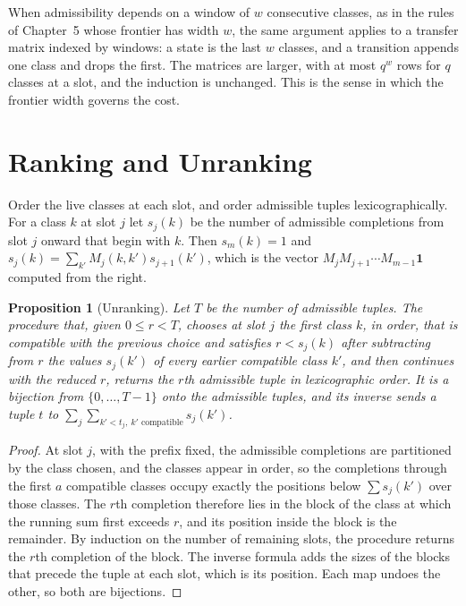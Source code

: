 \documentclass[11pt,twoside,openright]{book}
\theoremstyle{plain}
\newtheorem{proposition}[theorem]{Proposition}
\theoremstyle{definition}
\theoremstyle{remark}
\begin{document}
When admissibility depends on a window of $w$ consecutive classes, as in the rules of Chapter~5 whose frontier has width $w$, the same argument applies to a transfer matrix indexed by windows: a state is the last $w$ classes, and a transition appends one class and drops the first. The matrices are larger, with at most $q^w$ rows for $q$ classes at a slot, and the induction is unchanged. This is the sense in which the frontier width governs the cost.

\section{Ranking and Unranking}\label{sec:rank}

Order the live classes at each slot, and order admissible tuples lexicographically. For a class $k$ at slot $j$ let $s_j(k)$ be the number of admissible completions from slot $j$ onward that begin with $k$. Then $s_m(k)=1$ and $s_j(k)=\sum_{k'}M_j(k,k')s_{j+1}(k')$, which is the vector $M_jM_{j+1}\cdots M_{m-1}\mathbf 1$ computed from the right.

\begin{proposition}[Unranking]\label{prop:unrankapp}
Let $T$ be the number of admissible tuples. The procedure that, given $0\le r<T$, chooses at slot $j$ the first class $k$, in order, that is compatible with the previous choice and satisfies $r<s_j(k)$ after subtracting from $r$ the values $s_j(k')$ of every earlier compatible class $k'$, and then continues with the reduced $r$, returns the $r$th admissible tuple in lexicographic order. It is a bijection from $\{0,\dots,T-1\}$ onto the admissible tuples, and its inverse sends a tuple $t$ to $\sum_j\sum_{k'<t_j,\ k'\text{ compatible}}s_j(k')$.
\end{proposition}

\begin{proof}
At slot $j$, with the prefix fixed, the admissible completions are partitioned by the class chosen, and the classes appear in order, so the completions through the first $a$ compatible classes occupy exactly the positions below $\sum s_j(k')$ over those classes. The $r$th completion therefore lies in the block of the class at which the running sum first exceeds $r$, and its position inside the block is the remainder. By induction on the number of remaining slots, the procedure returns the $r$th completion of the block. The inverse formula adds the sizes of the blocks that precede the tuple at each slot, which is its position. Each map undoes the other, so both are bijections.
\end{proof}
\end{document}
